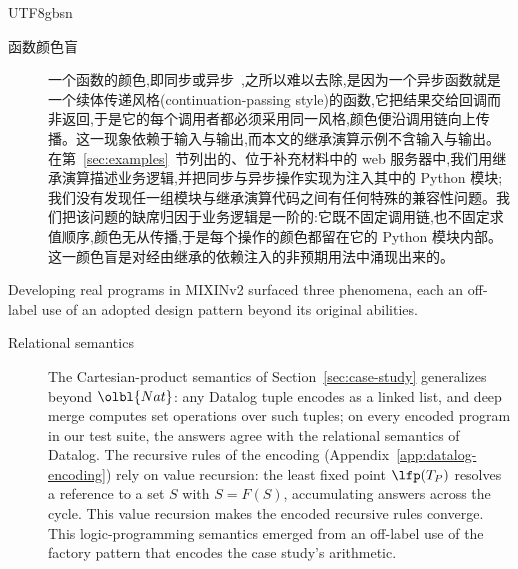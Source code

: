 \begin{CJK*}{UTF8}{gbsn}
\begin{description}
  \item[函数颜色盲]\label{sec:practical-function-color}
    一个函数的颜色,即同步或异步~\cite{nystrom2015-function-color},之所以难以去除,是因为一个异步函数就是一个续体传递风格(continuation-passing style)的函数,它把结果交给回调而非返回,于是它的每个调用者都必须采用同一风格,颜色便沿调用链向上传播。这一现象依赖于输入与输出,而本文的继承演算示例不含输入与输出。在第~\ref{sec:examples}~节列出的、位于补充材料中的 web 服务器中,我们用继承演算描述业务逻辑,并把同步与异步操作实现为注入其中的 Python 模块;我们没有发现任一组模块与继承演算代码之间有任何特殊的兼容性问题。我们把该问题的缺席归因于业务逻辑是一阶的:它既不固定调用链,也不固定求值顺序,颜色无从传播,于是每个操作的颜色都留在它的 Python 模块内部。这一颜色盲是对经由继承的依赖注入的非预期用法中涌现出来的。

\end{description}
\else
Developing real programs in MIXINv2 surfaced three phenomena, each an
off-label use of an adopted design pattern beyond its original abilities.

\begin{description}
  \item[Relational semantics]
    The Cartesian-product semantics of Section~\ref{sec:case-study}
    generalizes beyond $\olbl{Nat}$: any Datalog tuple encodes
    as a linked list, and deep merge computes set operations over such
    tuples; on every encoded program in our test suite, the answers agree with
    the relational semantics of Datalog.
    The recursive rules of the encoding
    (Appendix~\ref{app:datalog-encoding}) rely on value recursion: the least fixed point
    $\lfp(T_P)$ resolves a reference to a set $S$ with
    $S = F(S)$, accumulating answers across the cycle.
    This value recursion makes the encoded recursive rules converge.
    This logic-programming semantics emerged from an off-label use of
    the factory pattern that encodes the case study's arithmetic.


\end{description}
\end{CJK*}
